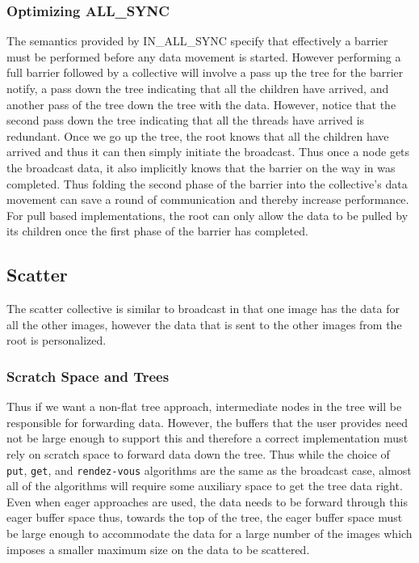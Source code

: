 \documentclass[times,10pt]{article}
\begin{document}
\subsubsection{Optimizing ALL\_SYNC}
 The semantics provided by IN\_ALL\_SYNC specify that effectively a barrier must be performed before any data movement is started. However performing a full barrier followed by a collective will involve a pass up the tree for the barrier notify, a pass down the tree indicating that all the children have arrived, and another pass of the tree down the tree with the data. However, notice that the second pass down the tree indicating that all the threads have arrived is redundant. Once we go up the tree, the root knows that all the children have arrived and thus it can then simply initiate the broadcast. Thus once a node gets the broadcast data, it also implicitly knows that the barrier on the way in was completed. Thus folding the second phase of the barrier into the collective's data movement can save a round of communication and thereby increase performance. For pull based implementations, the root can only allow the data to be pulled by its children once the first phase of the barrier has completed. 
 
 
\subsection{Scatter}
The scatter collective is similar to broadcast in that one image has the data for all the other images, however the data that is sent to the other images from the root is personalized. 

\subsubsection{Scratch Space and Trees}
Thus if we want a non-flat  tree approach, intermediate nodes in the tree will be responsible for forwarding data. However, the buffers that the user provides need not be large enough to support this and therefore a correct implementation must rely on scratch space to forward data down the tree. Thus while the choice of \texttt{put}, \texttt{get}, and \texttt{rendez-vous} algorithms are the same as the broadcast case, almost all of the algorithms will require some auxiliary space to get the tree data right.  Even when eager approaches are used, the data needs to be forward through this eager buffer space thus, towards the top of the tree, the eager buffer space must be large enough to accommodate the data for a large number of the images which imposes a smaller maximum size on the data to be scattered. 
\end{document}
